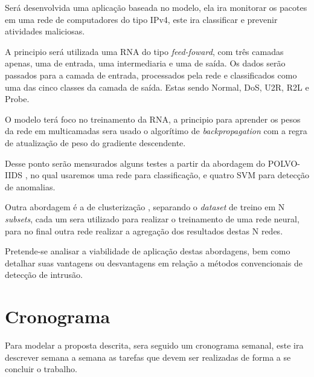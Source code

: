 \documentclass[
	12pt,				%
	openright,			%
	oneside,
	a4paper,			%
	english,			%
	french,				%
	spanish,			%
	brazil				%
	]{abntex2}
\begin{document}
Será desenvolvida uma aplicação baseada no modelo, ela ira monitorar os pacotes em uma rede de computadores do tipo IPv4, este ira classificar e prevenir atividades maliciosas.

A principio será utilizada uma RNA do tipo \textit{feed-foward}, com três camadas apenas, uma de entrada, uma intermediaria e uma de saída. Os dados serão passados para a camada de entrada, processados pela rede e classificados como uma das cinco classes da camada de saída. Estas sendo Normal, DoS, U2R, R2L e Probe.  

O modelo terá foco no treinamento da RNA, a principio para aprender os pesos da rede em multicamadas sera usado o algorítimo de \textit{backpropagation} com a regra de atualização de peso do gradiente descendente.

Desse ponto serão mensurados alguns testes a partir da abordagem do POLVO-IIDS \cite{polvo1}, no qual usaremos uma rede para classificação, e quatro SVM para detecção de anomalias.

Outra abordagem é a de clusterização \cite{Surana}, separando o \textit{dataset} de treino em N \textit{subsets}, cada um sera utilizado para realizar o treinamento de uma rede neural, para no final outra rede  realizar a agregação dos resultados destas N redes.

 
Pretende-se analisar a viabilidade de aplicação destas abordagens, bem como
detalhar suas vantagens ou desvantagens em relação a métodos convencionais de
detecção de intrusão.


\chapter[Cronograma]{Cronograma}

Para modelar a proposta descrita, sera seguido um cronograma semanal, este ira descrever semana a semana as tarefas que devem ser realizadas de forma a se concluir o trabalho.
\end{document}
